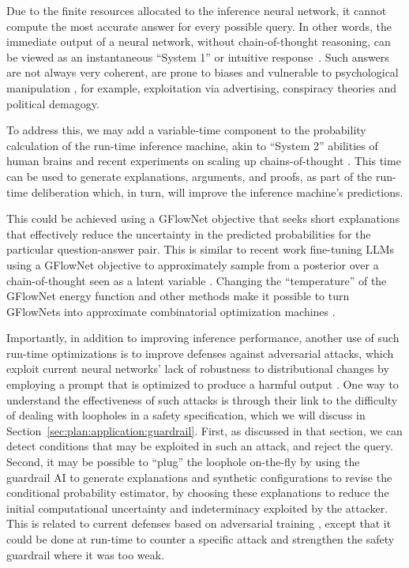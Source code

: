 Due to the finite resources allocated to the inference neural network, it cannot compute the most accurate answer for every possible query. In other words, the immediate output of a neural network, without chain-of-thought reasoning, can be viewed as an instantaneous ``System 1'' or intuitive response~\cite{en.wikipedia.org.wiki.Thinking..Fast.and.Slow,royalsocietypublishing.org.doi.full.10.1098.rspa.2021.0068}. Such answers are not always very coherent, are prone to biases and vulnerable to psychological manipulation \cite{en.wikipedia.org.wiki.Thinking..Fast.and.Slow}, for example, exploitation via advertising, conspiracy theories and political demagogy.

To address this, we may add a variable-time component to the probability calculation of the run-time inference machine, akin to ``System 2'' abilities of human brains \cite{en.wikipedia.org.wiki.Thinking..Fast.and.Slow,royalsocietypublishing.org.doi.full.10.1098.rspa.2021.0068} and recent experiments on scaling up chains-of-thought \cite{openai.com.index.learning.to.reason.with.llms}. This time can be used to generate explanations, arguments, and proofs, as part of the run-time deliberation which, in turn, will improve the inference machine’s predictions. 

This could be achieved using a GFlowNet objective that seeks short explanations that effectively reduce the uncertainty in the predicted probabilities for the particular question-answer pair. This is similar to recent work fine-tuning LLMs using a GFlowNet objective to approximately sample from a posterior over a chain-of-thought seen as a latent variable \cite{openreview.net.forum.id.Ouj6p4ca60}. Changing the ``temperature'' of the GFlowNet energy function and other methods make it possible to turn GFlowNets into approximate combinatorial optimization machines \cite{arxiv.org.abs.2403.07041}.

Importantly, in addition to improving inference performance, another use of such run-time optimizations is to improve defenses against adversarial attacks, which exploit current neural networks’ lack of robustness to distributional changes by employing a prompt that is optimized to produce a harmful output \cite{arxiv.org.abs.2307.15043}. One way to understand the effectiveness of such attacks is through their link to the difficulty of dealing with loopholes in a safety specification, which we will discuss in Section~\ref{sec:plan:application:guardrail}. First, as discussed in that section, we can detect conditions that may be exploited in such an attack, and reject the query. Second, it may be possible to ``plug'' the loophole on-the-fly by using the guardrail AI to generate explanations and synthetic configurations to revise the conditional probability estimator, by choosing these explanations to reduce the initial computational uncertainty and indeterminacy exploited by the attacker. This is related to current defenses based on adversarial training \cite{arxiv.org.abs.1412.6572}, except that it could be done at run-time to counter a specific attack and strengthen the safety guardrail where it was too weak.




